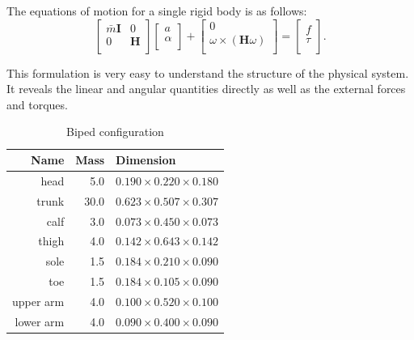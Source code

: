\documentclass{acm_proc_article-sp}
\begin{document}
The equations of motion for a single rigid body is as follows:
\begin{equation}
\left[ {\begin{array}{cc}
 \bar{m}\mathbf{I}  &  0 \\
 0            & \mathbf{H}  \\
 \end{array} } \right]
 \left[ {\begin{array}{c}
 a  \\
 \alpha              \\
 \end{array} } \right]
 +
 \left[ {\begin{array}{c}
 0  \\
 \omega\times(\mathbf{H}\omega)   \\
 \end{array} } \right]
 =
 \left[ {\begin{array}{c}
 f  \\
 \tau   \\
 \end{array} } \right].
\end{equation}

This formulation is very easy to understand the structure of
the physical system. It reveals the linear and angular quantities
directly as well as the external forces and torques.

\begin{table}[h!]
\centering
  \begin{tabular}{rrl}
  Name      & Mass  & Dimension                \\
  \hline
  head      & 5.0   & $0.190 \times 0.220 \times 0.180$  \\
  trunk     & 30.0  & $0.623 \times 0.507 \times 0.307$  \\
  calf      & 3.0   & $0.073 \times 0.450 \times 0.073$  \\
  thigh     & 4.0   & $0.142 \times 0.643 \times 0.142$  \\
  sole      & 1.5   & $0.184 \times 0.210 \times 0.090$  \\
  toe       & 1.5   & $0.184 \times 0.105 \times 0.090$  \\
  upper arm & 4.0   & $0.100 \times 0.520 \times 0.100$  \\
  lower arm & 4.0   & $0.090 \times 0.400 \times 0.090$  \\
  \hline
\end{tabular}
\caption{Biped configuration}
\end{table}
\end{document}
